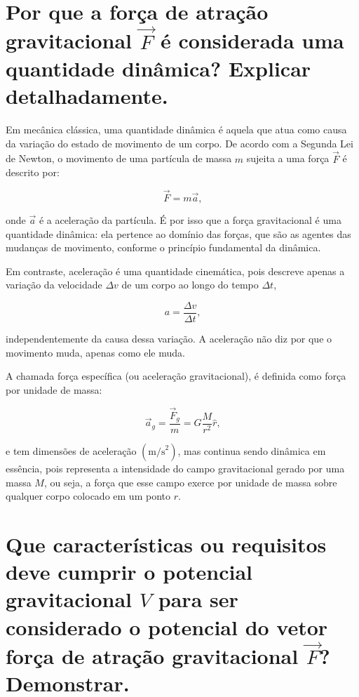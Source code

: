 

\section{Por que a força de atração gravitacional $\vec{F}$ é considerada uma quantidade dinâmica? Explicar detalhadamente.}


Em mecânica clássica, uma quantidade dinâmica é aquela que atua como causa da variação do estado de movimento de um corpo. De acordo com a Segunda Lei de Newton, o movimento de uma partícula de massa \( m \) sujeita a uma força \( \vec{F} \) é descrito por:

\[
\vec{F} = m \vec{a} \text{,}
\]

\noindent
onde \( \vec{a} \) é a aceleração da partícula. É por isso que a força gravitacional é uma quantidade dinâmica: ela pertence ao domínio das forças, que são as agentes das mudanças de movimento, conforme o princípio fundamental da dinâmica.

Em contraste, aceleração é uma quantidade cinemática, pois descreve apenas a variação da velocidade \(\Delta v\) de um corpo ao longo do tempo \(\Delta t\),

\[
a = \frac{\Delta v}{\Delta t} \text{,}
\]

\noindent
independentemente da causa dessa variação. A aceleração não diz por que o movimento muda, apenas como ele muda.

A chamada força específica (ou aceleração gravitacional), é definida como força por unidade de massa:

\[
\vec{a}_g = \frac{\vec{F}_g}{m} = G \frac{M}{r^2} \hat{r} \text{,}
\]


\noindent
e tem dimensões de aceleração \((\text{m/s}^2)\), mas continua sendo dinâmica em essência, pois representa a intensidade do campo gravitacional gerado por uma massa \(M\), ou seja, a força que esse campo exerce por unidade de massa sobre qualquer corpo colocado em um ponto \(r\).



\section{Que características ou requisitos deve cumprir o potencial gravitacional $V$ para ser considerado o potencial do vetor força de atração gravitacional $\vec{F}$? Demonstrar.}

